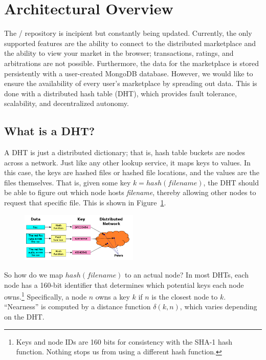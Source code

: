 \documentclass[11pt,twocolumn]{article}
\begin{document}
\section{Architectural Overview}
The \OpenBazaar/ repository is incipient but constantly being updated.
Currently, the only supported features are the ability to connect to the distributed marketplace and the ability to view your market in the browser; transactions, ratings, and arbitrations are not possible.
Furthermore, the data for the marketplace is stored persistently with a user-created MongoDB database.
However, we would like to ensure the availability of every user's marketplace by spreading out data.
This is done with a distributed hash table (DHT), which provides fault tolerance, scalability, and decentralized autonomy.

\subsection{What is a DHT?}
A DHT is just a distributed dictionary; that is, hash table buckets are nodes across a network.
Just like any other lookup service, it maps keys to values.
In this case, the keys are hashed files or hashed file locations, and the values are the files themselves.
That is, given some key $k = hash(filename)$, the DHT should be able to figure out which node hosts \emph{filename}, thereby allowing other nodes to request that specific file.
This is shown in Figure~\ref{DHT}.

\begin{figure}[h!]
  \centering
  \includegraphics[width=0.5\textwidth]{images/DHT.png}
  \caption{\label{DHT}}
\end{figure}

So how do we map $hash(filename)$ to an actual node? 
In most DHTs, each node has a 160-bit identifier that determines which potential keys each node owns.\footnote{Keys and node IDs are 160 bits for consistency with the SHA-1 hash function. Nothing stops us from using a different hash function.}
Specifically, a node $n$ owns a key $k$ if $n$ is the closest node to $k$.
``Nearness'' is computed by a distance function $\delta(k, n)$, which varies depending on the DHT.
\end{document}
